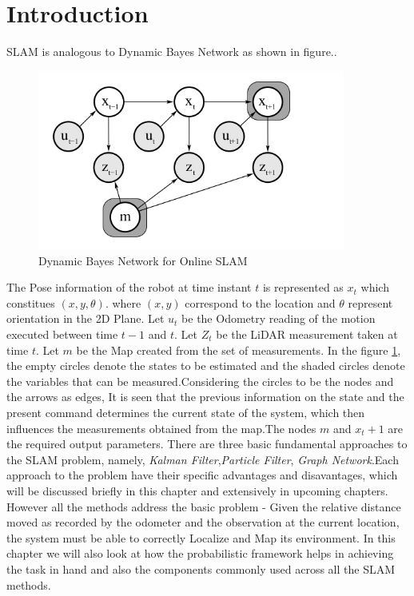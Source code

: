 \section*{Introduction}
    SLAM is analogous to Dynamic Bayes Network as shown in figure..
    \begin{figure}[h] \label{fig:DBNOn}
        \includegraphics[width=0.9\textwidth]{images/DBN_Online.png}
        \caption{Dynamic Bayes Network for Online SLAM}
    \end{figure}
        The Pose information of the robot at time instant $t$ is represented as $x_t$ which constitues $(x,y,\theta)$.
where $(x,y)$ correspond to the location and $\theta$ represent orientation in the 2D Plane. Let $u_t$ be the Odometry reading of the motion executed between time $t-1$ and $t$. Let $Z_t$ be the LiDAR measurement
taken at time $t$. Let $m$ be the Map created from the set of measurements. In the figure \ref{fig:DBNOn}, the empty circles denote the states to be estimated and the shaded circles denote the variables that can be 
measured.Considering the circles to be the nodes and the arrows as edges, It is seen that the previous information on the state and the present command determines the current state of the system, which then influences the 
measurements obtained from the map.The nodes $m$ and $x_t+1$ are the required output parameters. There are three basic fundamental approaches to the SLAM problem, namely, \textit{Kalman Filter},\textit{Particle Filter},
\textit{Graph Network}.Each approach to the problem have their specific advantages and disavantages, which will be discussed briefly in this chapter and extensively in upcoming chapters.
 However all the methods address the basic problem -
Given the relative distance moved as recorded by the odometer and the observation at the current location, the system must be able to correctly Localize and Map its environment. 
In this chapter we will also look at how the probabilistic framework helps in achieving the task in hand and also the components commonly used across all the SLAM methods.
